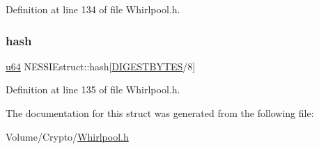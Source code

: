 Definition at line 134 of file Whirlpool.\+h.

\mbox{\label{struct_n_e_s_s_i_estruct_a2736107035063134f67f3e956889b30b}} 
\subsubsection{\texorpdfstring{hash}{hash}}
{\footnotesize\ttfamily \hyperlink{_whirlpool_8h_ad758b7a5c3f18ed79d2fcd23d9f16357}{u64} N\+E\+S\+S\+I\+Estruct\+::hash\mbox{[}\hyperlink{_whirlpool_8h_a5dd8ae4ea5670bfa53f78909ed32b3b3}{D\+I\+G\+E\+S\+T\+B\+Y\+T\+ES}/8\mbox{]}}



Definition at line 135 of file Whirlpool.\+h.



The documentation for this struct was generated from the following file\+:\begin{DoxyCompactItemize}
\item 
Volume/\+Crypto/\hyperlink{_whirlpool_8h}{Whirlpool.\+h}\end{DoxyCompactItemize}
